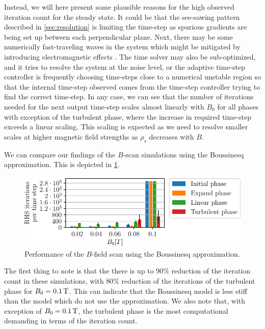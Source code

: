 Instead, we will here present some plausible reasons for the high observed iteration count for the steady state.
It could be that the see-sawing pattern described in \cref{sec:resolution} is limiting the time-step as spurious gradients are being set up between each perpendicular plane.
Next, there may be some numerically fast-traveling waves in the system which might be mitigated by introducing electromagnetic effects \cite{Dudson2015Private}.
The time solver may also be sub-optimized, and it tries to resolve the system at the noise level, or the adaptive time-step controller is frequently choosing time-steps close to a numerical unstable region so that the internal time-step observed comes from the time-step controller trying to find the correct time-step.
In any case, we can see that the number of iterations needed for the next output time-step scales almost linearly with $B_0$ for all phases with exception of the turbulent phase, where the increase in required time-step exceeds a linear scaling.
This scaling is expected as we need to resolve smaller scales at higher magnetic field strengths as $\rho_s$ decreases with $B$.

We can compare our findings of the $B$-scan simulations using the Boussinesq approximation.
This is depicted in \cref{fig:BoussPerformance}.
%
\begin{figure}[htb]
    \centering
    \includegraphics{fig/results/performance/RHSEvalsPerTimeBoussinesqScan}
    \caption{Performance of the $B$-field scan using the Boussinesq approximation.}
    \label{fig:BoussPerformance}
\end{figure}
%
The first thing to note is that the there is up to $90 \%$ reduction of the iteration count in these simulations, with $80\%$ reduction of the iterations of the turbulent phase for $B_0=0.1\, \text{T}$.
This can indicate that the Boussinesq model is less stiff than the model which do not use the approximation.
We also note that, with exception of $B_0=0.1\, \text{T}$, the turbulent phase is the most computational demanding in terms of the iteration count.

